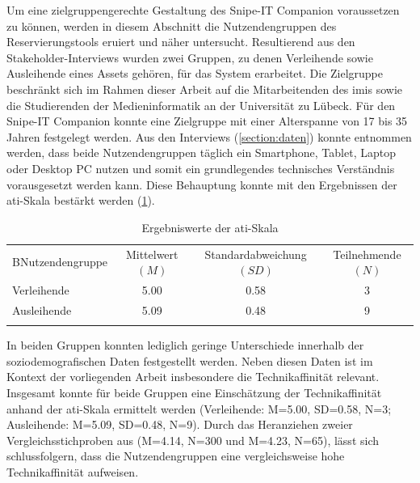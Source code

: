 \label{section:Nutzenden}
Um eine zielgruppengerechte Gestaltung des Snipe-IT Companion voraussetzen zu können, werden in
diesem Abschnitt die Nutzendengruppen des Reservierungstools eruiert und näher untersucht.
Resultierend aus den Stakeholder-Interviews wurden zwei Gruppen, zu denen Verleihende sowie
Ausleihende eines Assets gehören, für das System erarbeitet. Die Zielgruppe beschränkt sich im
Rahmen dieser Arbeit auf die Mitarbeitenden des \ac{imis} sowie die Studierenden der
Medieninformatik an der Universität zu Lübeck. Für den Snipe-IT Companion konnte eine Zielgruppe mit
einer Alterspanne von 17 bis 35 Jahren festgelegt werden. Aus den Interviews (\ref{section:daten})
konnte entnommen werden, dass beide Nutzendengruppen täglich ein Smartphone, Tablet, Laptop oder
Desktop PC nutzen und somit ein grundlegendes technisches Verständnis vorausgesetzt werden kann.
Diese Behauptung konnte mit den Ergebnissen der \ac{ati}-Skala bestärkt werden (\ref{table:ati}).

\begin{table}[h]
        \centering
        \caption{Ergebniswerte der \ac{ati}-Skala}
        \begin{tabular}{lccc}
                \arrayrulecolor{maincolor}\hline
                \sffamily\color{maincolor}BNutzendengruppe & \sffamily\color{maincolor}Mittelwert
                $(M)$                                    & \sffamily\color{maincolor}Standardabweichung $(SD)$ &
                \sffamily\color{maincolor}Teilnehmende $(N)$                                                          \\
                \arrayrulecolor{maincolor}\hline
                Verleihende                              & 5.00                                                & 0.58
                                                         & 3                                                          \\
                Ausleihende                              & 5.09                                                & 0.48
                                                         & 9                                                          \\
                \arrayrulecolor{maincolor}\hline
        \end{tabular}
        \label{table:ati}
\end{table}

In beiden Gruppen konnten lediglich geringe Unterschiede innerhalb der soziodemografischen Daten
festgestellt werden. Neben diesen Daten ist im Kontext der vorliegenden Arbeit insbesondere die
Technikaffinität relevant. Insgesamt konnte für beide Gruppen eine Einschätzung der Technikaffinität
anhand der \ac{ati}-Skala ermittelt werden (Verleihende: M=5.00, SD=0.58, N=3; Ausleihende: M=5.09,
SD=0.48, N=9). Durch das Heranziehen zweier Vergleichsstichproben aus 
(M=4.14, N=300 und M=4.23, N=65), lässt sich schlussfolgern, dass die Nutzendengruppen eine
vergleichsweise hohe Technikaffinität aufweisen.



